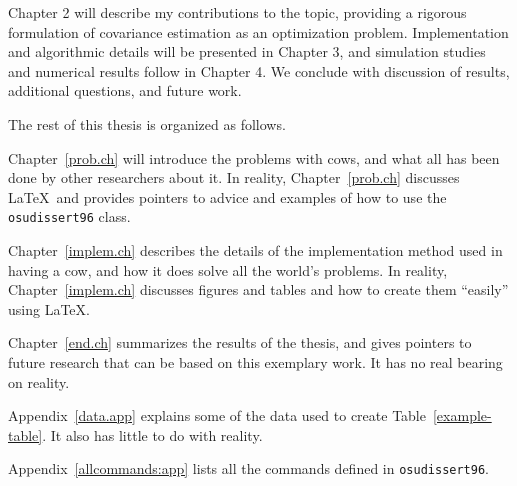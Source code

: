 Chapter 2 will describe my contributions to the topic, providing a rigorous formulation of covariance estimation as an optimization problem. Implementation and algorithmic details will be presented in Chapter 3, and simulation studies and numerical results follow in Chapter 4. We conclude with discussion of results, additional questions, and future work.


The rest of this thesis is organized as follows. 

Chapter~\ref{prob.ch} will introduce the problems with cows, and what
all has been done by other researchers about it.  In reality,
Chapter~\ref{prob.ch} discusses \LaTeX\ and provides pointers to
advice and examples of how to use the {\tt osudissert96} class.

Chapter~\ref{implem.ch} describes the details of the implementation
method used in having a cow, and how it does solve all the world's
problems. In reality, Chapter~\ref{implem.ch} discusses figures and
tables and how to create them ``easily'' using \LaTeX.

Chapter~\ref{end.ch} summarizes the results of the thesis, and gives
pointers to future research that can be based on this exemplary work.
It has no real bearing on reality.

Appendix~\ref{data.app} explains some of the data used to create
Table~\ref{example-table}. It also has little to do with reality.

Appendix~\ref{allcommands:app} lists all the commands defined in
{\tt osudissert96}.
